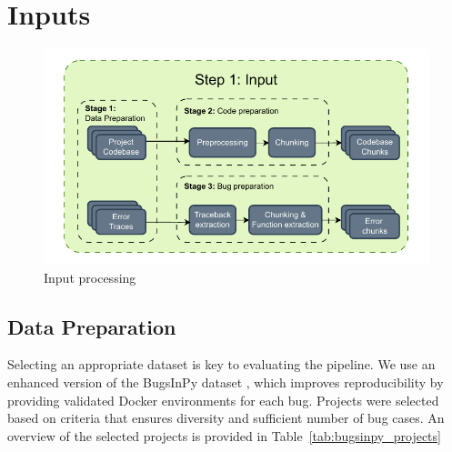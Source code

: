 \section{Inputs}

\begin{figure}[H]
\centering
\includegraphics[width=1\columnwidth]{Figures/Step1_input.drawio.pdf}
\caption{Input processing}
\label{fig:step1_input}
\end{figure}


\subsection{Data Preparation}
Selecting an appropriate dataset is key to evaluating the pipeline. We use an enhanced version of the BugsInPy dataset \citep{aguilar2023reproducing}, which improves reproducibility by providing validated Docker environments for each bug. Projects were selected based on criteria that ensures diversity and sufficient number of bug cases. An overview of the selected projects is provided in Table~\ref{tab:bugsinpy_projects}

